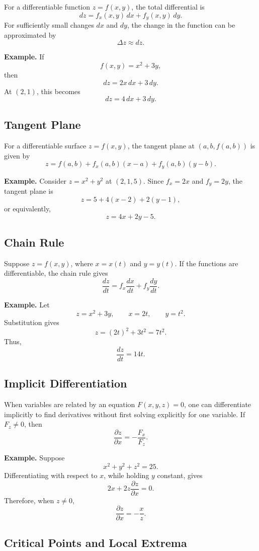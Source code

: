 \documentclass[a4paper,12pt]{article}
\theoremstyle{mystyle}
\numberwithin{equation}{section}
\numberwithin{theorem}{section}
\numberwithin{proposition}{section}
\numberwithin{example}{section}
\numberwithin{remark}{section}
\numberwithin{lemma}{section}
\numberwithin{corollary}{section}
\numberwithin{definition}{section}
\begin{document}
For a differentiable function \(z=f(x,y)\), the total differential is
\[
dz=f_x(x,y)\,dx+f_y(x,y)\,dy.
\]
For sufficiently small changes \(dx\) and \(dy\), the change in the
function can be approximated by
\[
\Delta z\approx dz.
\]

\textbf{Example.} If
\[
f(x,y)=x^{2}+3y,
\]
then
\[
dz=2x\,dx+3\,dy.
\]
At \((2,1)\), this becomes
\[
dz=4\,dx+3\,dy.
\]

\subsection{Tangent Plane}

For a differentiable surface \(z=f(x,y)\), the tangent plane at
\((a,b,f(a,b))\) is given by
\[
z=f(a,b)+f_x(a,b)(x-a)+f_y(a,b)(y-b).
\]

\textbf{Example.} Consider \(z=x^{2}+y^{2}\) at \((2,1,5)\).
Since \(f_x=2x\) and \(f_y=2y\), the tangent plane is
\[
z=5+4(x-2)+2(y-1),
\]
or equivalently,
\[
z=4x+2y-5.
\]

\subsection{Chain Rule}

Suppose \(z=f(x,y)\), where \(x=x(t)\) and \(y=y(t)\). If the
functions are differentiable, the chain rule gives
\[
\frac{dz}{dt}
=f_x\frac{dx}{dt}+f_y\frac{dy}{dt}.
\]

\textbf{Example.} Let
\[
z=x^{2}+3y,\qquad x=2t,\qquad y=t^{2}.
\]
Substitution gives
\[
z=(2t)^{2}+3t^{2}=7t^{2}.
\]
Thus,
\[
\frac{dz}{dt}=14t.
\]

\subsection{Implicit Differentiation}

When variables are related by an equation \(F(x,y,z)=0\), one can
differentiate implicitly to find derivatives without first solving
explicitly for one variable. If \(F_z\ne0\), then
\[
\frac{\partial z}{\partial x}=-\frac{F_x}{F_z}.
\]

\textbf{Example.} Suppose
\[
x^{2}+y^{2}+z^{2}=25.
\]
Differentiating with respect to \(x\), while holding \(y\) constant,
gives
\[
2x+2z\frac{\partial z}{\partial x}=0.
\]
Therefore, when \(z\ne0\),
\[
\frac{\partial z}{\partial x}=-\frac{x}{z}.
\]

\subsection{Critical Points and Local Extrema}
\end{document}
